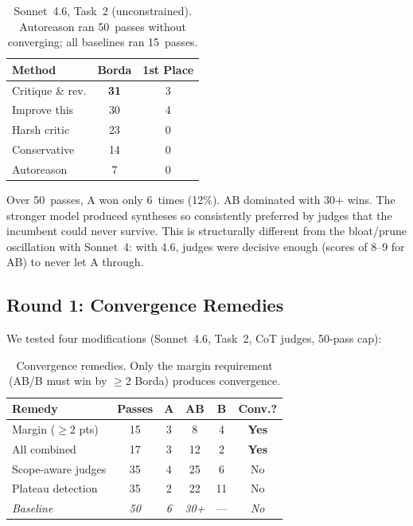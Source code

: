 \documentclass[10pt,twocolumn]{article}
\begin{document}
\begin{table}[H]
\centering
\small
\begin{tabular}{@{}lcc@{}}
\toprule
\textbf{Method} & \textbf{Borda} & \textbf{1st Place} \\
\midrule
Critique \& rev. & \textbf{31} & 3 \\
\rowcolor{TableShade}
Improve this & 30 & 4 \\
Harsh critic & 23 & 0 \\
\rowcolor{TableShade}
Conservative & 14 & 0 \\
Autoreason & 7 & 0 \\
\bottomrule
\end{tabular}
\caption{Sonnet~4.6, Task~2 (unconstrained). Autoreason ran 50~passes without converging; all baselines ran 15~passes.}
\label{tab:scaling}
\end{table}

Over 50~passes, A won only 6~times (12\%). AB dominated with 30+ wins. The stronger model produced syntheses so consistently preferred by judges that the incumbent could never survive. This is structurally different from the bloat/prune oscillation with Sonnet~4: with 4.6, judges were decisive enough (scores of 8--9 for AB) to never let A through.

\subsection{Round 1: Convergence Remedies}

We tested four modifications (Sonnet~4.6, Task~2, CoT judges, 50-pass cap):

\begin{table}[H]
\centering
\small
\begin{tabular}{@{}lccccc@{}}
\toprule
\textbf{Remedy} & \textbf{Passes} & \textbf{A} & \textbf{AB} & \textbf{B} & \textbf{Conv.?} \\
\midrule
\rowcolor{TableShade}
Margin ($\geq$2 pts) & 15 & 3 & 8 & 4 & \textbf{Yes} \\
All combined & 17 & 3 & 12 & 2 & \textbf{Yes} \\
\rowcolor{TableShade}
Scope-aware judges & 35 & 4 & 25 & 6 & No \\
Plateau detection & 35 & 2 & 22 & 11 & No \\
\rowcolor{TableShade}
\textit{Baseline} & \textit{50} & \textit{6} & \textit{30+} & --- & \textit{No} \\
\bottomrule
\end{tabular}
\caption{Convergence remedies. Only the margin requirement (AB/B must win by $\geq$2 Borda) produces convergence.}
\label{tab:remedies}
\end{table}
\end{document}
